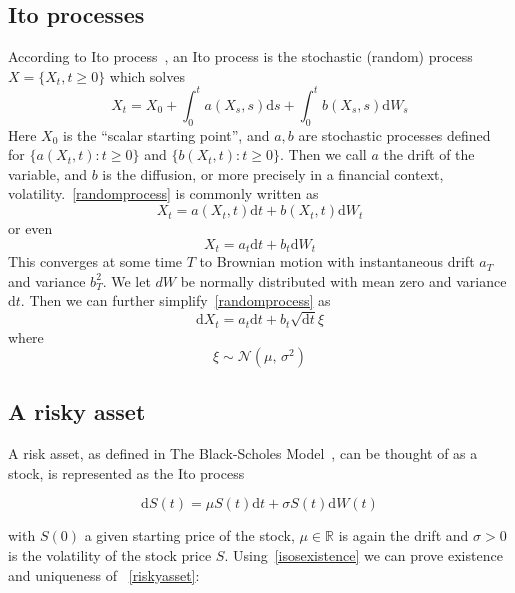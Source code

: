 \documentclass[11pt]{article} %
\begin{document}
\subsection{Ito processes}

According to Ito process~\cite{itoprocess}, an Ito process is the stochastic (random) 
process $X = \{X_t, t \geq 0\}$ which solves 
\begin{equation} \label{randomprocess}
X_t = X_0 + \int_{0}^{t} a(X_s, s)\mathrm{d}s + 
\int_{0}^{t} b(X_s, s) \mathrm{d}W_s
\end{equation}
Here $X_0$ is the ``scalar starting point'', and $a,b$ are stochastic 
processes defined for $\{a(X_t, t) : t\geq0\} $ and $\{b(X_t, t) : t\geq0\}$. 
Then we call $a$ the drift of the variable, and $b$ is the diffusion, 
or more precisely in a financial context, volatility.~\eqref{randomprocess} is commonly 
written as 
\begin{equation}
    X_t = a(X_t, t)\mathrm{d}t + b(X_t, t)\mathrm{d}W_t
\end{equation}
or even 
\begin{equation} \label{itoprocess}
    X_t = a_t\mathrm{d}t + b_t\mathrm{d}W_t
\end{equation}
This converges at some time $T$ to Brownian motion with instantaneous drift $a_T$ and
variance $b_T^2$. We let $dW$ be normally distributed with mean zero and variance 
$\mathrm{d}t$. Then we can further simplify~\eqref{randomprocess} as 
\begin{equation}
    \mathrm{d}X_t = a_t\mathrm{d}t + b_t \sqrt{\mathrm{d}t}\xi
\end{equation}
where
\begin{equation}
    \xi \sim \mathcal{N}(\mu,\,\sigma^{2})
\end{equation}


\subsection{A risky asset}

A risk asset, as defined in The Black-Scholes Model~\cite{blackscholes}, 
can be thought of as a stock, is represented as the Ito process

\begin{equation} \label{riskyasset}
    \mathrm{d}S(t) = \mu S(t)\mathrm{d}t + \sigma S(t) \mathrm{d}W(t)
\end{equation}

with $S(0)$ a given starting price of the stock, $\mu \in \mathbb{R}$ 
is again the drift and $\sigma > 0$ is the volatility of the stock 
price $S$. Using~\eqref{isosexistence} we can prove existence and uniqueness of 
~\eqref{riskyasset}:
\end{document}
